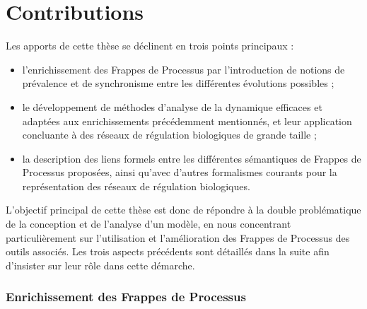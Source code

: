 \section{Contributions}

Les apports de cette thèse se déclinent en trois points principaux :
\begin{itemize}
  \item l'enrichissement des Frappes de Processus par l'introduction de notions
    de prévalence et de synchronisme entre les différentes évolutions possibles ;
  \item le développement de méthodes d'analyse de la dynamique efficaces
    et adaptées aux enrichissements précédemment mentionnés,
    et leur application concluante à des réseaux de régulation biologiques de grande taille ;
  \item la description des liens formels entre les différentes sémantiques de Frappes de Processus
    proposées, ainsi qu'avec d'autres formalismes courants pour la représentation
    des réseaux de régulation biologiques.
\end{itemize}
L'objectif principal de cette thèse est donc de répondre à la double problématique
de la conception et de l'analyse d'un modèle,
en nous concentrant particulièrement sur l'utilisation et l'amélioration
des Frappes de Processus des outils associés.
Les trois aspects précédents sont détaillés dans la suite
afin d'insister sur leur rôle dans cette démarche.

\subsubsection*{Enrichissement des Frappes de Processus}

